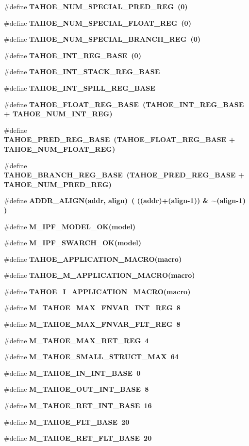 \begin{CompactItemize}
\item 
\#define \bf{TAHOE\_\-NUM\_\-SPECIAL\_\-PRED\_\-REG}~(0)
\item 
\#define \bf{TAHOE\_\-NUM\_\-SPECIAL\_\-FLOAT\_\-REG}~(0)
\item 
\#define \bf{TAHOE\_\-NUM\_\-SPECIAL\_\-BRANCH\_\-REG}~(0)
\item 
\#define \bf{TAHOE\_\-INT\_\-REG\_\-BASE}~(0)
\item 
\#define \bf{TAHOE\_\-INT\_\-STACK\_\-REG\_\-BASE}
\item 
\#define \bf{TAHOE\_\-INT\_\-SPILL\_\-REG\_\-BASE}
\item 
\#define \bf{TAHOE\_\-FLOAT\_\-REG\_\-BASE}~(TAHOE\_\-INT\_\-REG\_\-BASE + TAHOE\_\-NUM\_\-INT\_\-REG)
\item 
\#define \bf{TAHOE\_\-PRED\_\-REG\_\-BASE}~(TAHOE\_\-FLOAT\_\-REG\_\-BASE + TAHOE\_\-NUM\_\-FLOAT\_\-REG)
\item 
\#define \bf{TAHOE\_\-BRANCH\_\-REG\_\-BASE}~(TAHOE\_\-PRED\_\-REG\_\-BASE + TAHOE\_\-NUM\_\-PRED\_\-REG)
\item 
\#define \bf{ADDR\_\-ALIGN}(addr, align)~( ((addr)+(align-1)) \& $\sim$(align-1) )
\item 
\#define \bf{M\_\-IPF\_\-MODEL\_\-OK}(model)
\item 
\#define \bf{M\_\-IPF\_\-SWARCH\_\-OK}(model)
\item 
\#define \bf{TAHOE\_\-APPLICATION\_\-MACRO}(macro)
\item 
\#define \bf{TAHOE\_\-M\_\-APPLICATION\_\-MACRO}(macro)
\item 
\#define \bf{TAHOE\_\-I\_\-APPLICATION\_\-MACRO}(macro)
\item 
\#define \bf{M\_\-TAHOE\_\-MAX\_\-FNVAR\_\-INT\_\-REG}~8
\item 
\#define \bf{M\_\-TAHOE\_\-MAX\_\-FNVAR\_\-FLT\_\-REG}~8
\item 
\#define \bf{M\_\-TAHOE\_\-MAX\_\-RET\_\-REG}~4
\item 
\#define \bf{M\_\-TAHOE\_\-SMALL\_\-STRUCT\_\-MAX}~64
\item 
\#define \bf{M\_\-TAHOE\_\-IN\_\-INT\_\-BASE}~0
\item 
\#define \bf{M\_\-TAHOE\_\-OUT\_\-INT\_\-BASE}~8
\item 
\#define \bf{M\_\-TAHOE\_\-RET\_\-INT\_\-BASE}~16
\item 
\#define \bf{M\_\-TAHOE\_\-FLT\_\-BASE}~20
\item 
\#define \bf{M\_\-TAHOE\_\-RET\_\-FLT\_\-BASE}~20
\item 

\end{CompactItemize}
